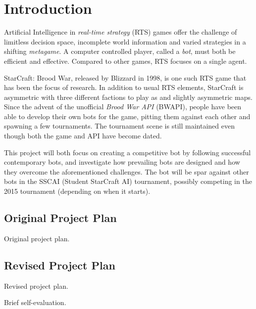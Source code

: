 \chapter{Introduction}
Artificial Intelligence in \emph{real-time strategy} (RTS) games offer the challenge of limitless decision space, incomplete world information and varied strategies in a shifting \emph{metagame}. A computer controlled player, called a \emph{bot}, must both be efficient and effective. Compared to other games, RTS focuses on a single agent.

StarCraft: Brood War, released by Blizzard in 1998, is one such RTS game that has been the focus of research. In addition to usual RTS elements, StarCraft is asymmetric with three different factions to play as and slightly asymmetric maps. Since the advent of the unofficial \emph{Brood War API} (BWAPI), people have been able to develop their own bots for the game, pitting them against each other and spawning a few tournaments. The tournament scene is still maintained even though both the game and API have become dated.

This project will both focus on creating a competitive bot by following successful contemporary bots, and investigate how prevailing bots are designed and how they overcome the aforementioned challenges. The bot will be spar against other bots in the SSCAI (Student StarCraft AI) tournament, possibly competing in the 2015 tournament (depending on when it starts).

\section*{Original Project Plan}
Original project plan.

\section*{Revised Project Plan}
Revised project plan.

Brief self-evaluation.
